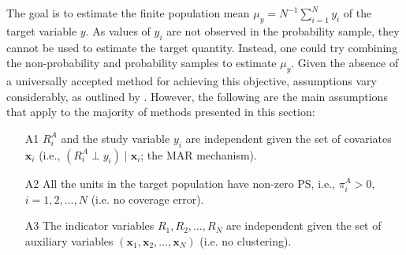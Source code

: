 \documentclass[
]{jss}
\begin{document}
\begin{table}[ht!]
    \centering
    \caption{Two-sample setting}
    \label{tab-two-sources}
\end{table}

The goal is to estimate the finite population mean
\(\mu_y=N^{-1}\sum_{i=1}^{N} y_{i}\) of the target variable \(y\). As
values of \(y_{i}\) are not observed in the probability sample, they
cannot be used to estimate the target quantity. Instead, one could try
combining the non-probability and probability samples to estimate
\(\mu_y\). Given the absence of a universally accepted method for
achieving this objective, assumptions vary considerably, as outlined by
\cite{wu2022statistical}. However, the following are the main
assumptions that apply to the majority of methods presented in this
section:

\begin{itemize}
\item[A1] $R_i^A$ and the study variable $y_i$ are independent given the set of covariates $\boldsymbol{x}_i$ (i.e., $\left(R_i^A \perp y_i\right) \mid \boldsymbol{x}_i$; the MAR mechanism).
\item[A2] All the units in the target population have non-zero PS, i.e., $\pi_i^A>0$, $i=1,2, \ldots, N$ (i.e. no coverage error).
\item[A3] The indicator variables $R_1, R_2, \ldots, R_N$ are independent given the set of auxiliary variables $\left(\boldsymbol{x}_1, \boldsymbol{x}_2, \ldots, \boldsymbol{x}_N\right)$ (i.e. no clustering).
\end{itemize}
\end{document}
